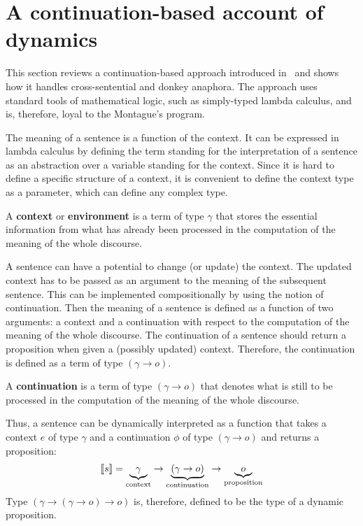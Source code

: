 \section{A continuation-based account of dynamics} \label{sec:cont_based_dyn}

This section reviews a continuation-based approach introduced in~\cite{deGroote:2006:Towards-a-Montagovian-Account-of-Dynamics} and shows how it handles cross-sentential and donkey anaphora. The approach uses standard tools of mathematical logic, such as simply-typed lambda calculus, and is, therefore, loyal to the Montague's program. 
 
The meaning of a sentence is a function of the context. It can be expressed in lambda calculus by defining the term standing for the interpretation of a sentence as an abstraction over a variable standing for the context. Since it is hard to define a specific structure of a context, it is convenient to define the context type as a parameter, which can define any complex type.
\begin{definition} A \textbf{context} or \textbf{environment} is a term of type $\gamma$ that stores the essential information from what has already been processed in the computation of the meaning of the whole discourse.
\end{definition}
A sentence can have a potential to change (or update) the context. The updated context has to be passed as an argument to the meaning of the subsequent sentence. This can be implemented compositionally by using the notion of continuation. Then the meaning of a sentence is defined as a function of two arguments: a context and a continuation with respect to the computation of the meaning of the whole discourse.
The continuation of a sentence should return a proposition when given a (possibly updated) context. Therefore, the continuation is defined as a term of type $(\gamma \rightarrow o)$.
\begin{definition}[Continuation] A \textbf{continuation} is a term of type $(\gamma \rightarrow o)$ that denotes what is still to be processed in the computation of the meaning of the whole discourse. 
\end{definition}
Thus, a sentence can be dynamically interpreted as a function that takes a context $e$ of type $\gamma$ and a continuation $\phi$ of type $(\gamma \rightarrow o)$ and returns a proposition:
\begin{align}
[\![s]\!] = \underbrace{\gamma}_{\text{context}} \rightarrow \underbrace{(\gamma \rightarrow o)}_{\text{continuation}} \rightarrow \underbrace{o}_{
\text{proposition}} \notag
\end{align}
Type  $(\gamma \rightarrow (\gamma \rightarrow o) \rightarrow o)$ is, therefore, defined to be the type of a dynamic proposition.
 

